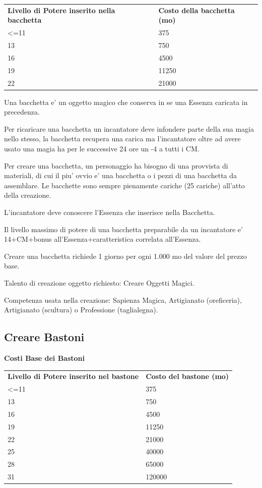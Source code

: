 \documentclass[a4paper,11pt,twoside,openany]{book}
\begin{document}
\begin{tabular}{ll}
\toprule
\textbf{Livello di Potere inserito nella bacchetta} & \textbf{Costo della bacchetta (mo)}\tabularnewline
\textless=11 & 375\tabularnewline
13 & 750\tabularnewline
16 & 4500\tabularnewline
19 & 11250\tabularnewline
22 & 21000\tabularnewline
\end{tabular}

\bigskip

Una bacchetta e' un oggetto magico che conserva in se una Essenza caricata in precedenza.

Per ricaricare una bacchetta un incantatore deve infondere parte della sua magia nello stesso, la bacchetta recupera una carica ma l'incantatore oltre ad avere usato una magia ha per le successive 24 ore un -4 a tutti i CM.

Per creare una bacchetta, un personaggio ha bisogno di una provvista di materiali, di cui il piu' ovvio e' una bacchetta o i pezzi di una bacchetta da assemblare. Le bacchette sono sempre pienamente cariche (25 cariche) all'atto della creazione.

L'incantatore deve conoscere l'Essenza che inserisce nella Bacchetta.

Il livello massimo di potere di una bacchetta preparabile da un incantatore e' 14+CM+bonus all'Essenza+caratteristica correlata all'Essenza.

Creare una bacchetta richiede 1 giorno per ogni 1.000 mo del valore del prezzo base.

Talento di creazione oggetto richiesto: Creare Oggetti Magici.

Competenza usata nella creazione: Sapienza Magica, Artigianato (oreficeria),
Artigianato (scultura) o Professione (taglialegna).

\subsection{Creare Bastoni}

\textbf{Costi Base dei Bastoni}

\bigskip

\begin{tabular}{ll}
\toprule
\textbf{Livello di Potere inserito nel bastone} & \textbf{Costo del bastone (mo)}\tabularnewline
\textless=11 & 375\tabularnewline
13 & 750\tabularnewline
16 & 4500\tabularnewline
19 & 11250\tabularnewline
22 & 21000\tabularnewline
25 & 40000\tabularnewline
28 & 65000\tabularnewline
31 & 120000\tabularnewline
\end{tabular}
\end{document}
